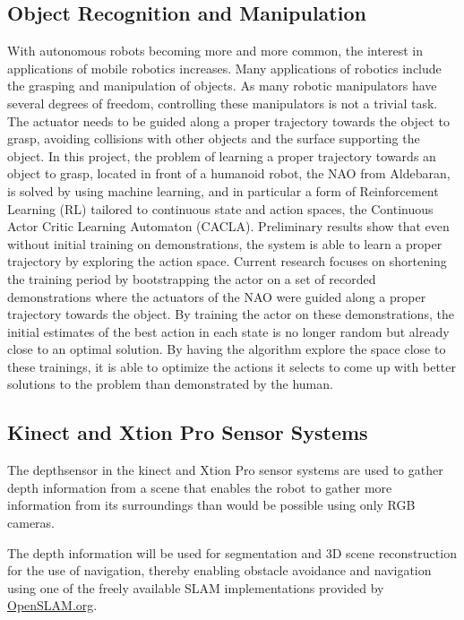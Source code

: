 \documentclass[runningheads,a4paper]{llncs}
\begin{document}
\subsection{Object Recognition and Manipulation}

With autonomous robots becoming more and more common, the interest in applications of mobile robotics increases. 
Many applications of robotics include the grasping and manipulation of objects. 
As many robotic manipulators have several degrees of freedom, controlling these manipulators is not a trivial task. 
The actuator needs to be guided along a proper trajectory towards the object to grasp, avoiding collisions with other objects and the surface supporting the object. 
In this project, the problem of learning a proper trajectory towards an object to grasp, located in front of a humanoid robot, the NAO from Aldebaran, is solved by using machine learning, and in particular a form of Reinforcement Learning (RL) tailored to continuous state and action spaces, the Continuous Actor Critic Learning Automaton (CACLA). 
Preliminary results show that even without initial training on demonstrations, the system is able to learn a proper trajectory by exploring the action space.
Current research focuses on shortening the training period by bootstrapping the actor on a set of recorded demonstrations where the actuators of the NAO were guided along a proper trajectory towards the object. 
By training the actor on these demonstrations, the initial estimates of the best action in each state is no longer random but already close to an optimal solution. 
By having the algorithm explore the space close to these trainings, it is able to optimize the actions it selects to come up with better solutions to the problem than demonstrated by the human. 


\subsection{Kinect and Xtion Pro Sensor Systems}

The depthsensor in the kinect and Xtion Pro sensor systems are used to gather depth information from a scene that enables the robot to gather more information from its surroundings than would be possible using only RGB cameras.

The depth information will be used for segmentation and 3D scene reconstruction for the use of navigation, thereby enabling obstacle avoidance and navigation using one of the freely available SLAM implementations provided by \url{OpenSLAM.org}.
\end{document}
